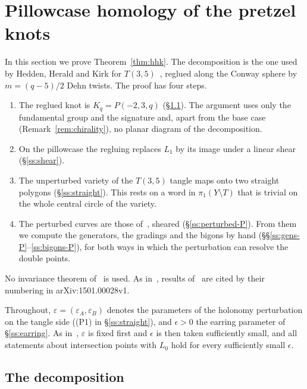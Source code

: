 \section{Pillowcase homology of the pretzel knots}\label{sec:sheared}

In this section we prove Theorem~\ref{thm:hhk}. The decomposition is the one used by Hedden, Herald and Kirk
for $T(3,5)$~\cite[\S10]{HHK2}, reglued along the Conway sphere by $m=(q-5)/2$ Dehn twists. The proof has
four steps.
\begin{enumerate}
\item The reglued knot is $K_q=P(-2,3,q)$ (\S\ref{ss:decomp-P}). The argument uses only the fundamental group and the
signature and, apart from the base case (Remark~\ref{rem:chirality}), no planar diagram of the decomposition.
\item On the pillowcase the regluing replaces $L_1$ by its image under a linear shear (\S\ref{ss:shear}).
\item The unperturbed variety of the $T(3,5)$ tangle maps onto two straight polygons (\S\ref{ss:straight}). This rests
on a word in $\pi_1(Y\setminus T)$ that is trivial on the whole central circle of the variety.
\item The perturbed curves are those of~\cite{WuebbenV}, sheared (\S\ref{ss:perturbed-P}). From them we compute the
generators, the gradings and the bigons by hand (\S\S\ref{ss:gens-P}--\ref{ss:bigons-P}), for both ways in which the
perturbation can resolve the double points.
\end{enumerate}
No invariance theorem of~\cite{HHK2} is used. As in~\cite{WuebbenV}, results of~\cite{HHK2} are cited by their
numbering in arXiv:1501.00028v1.

Throughout, $\varepsilon=(\varepsilon_A,\varepsilon_B)$ denotes the parameters of the holonomy perturbation on the tangle side
((P1) in \S\ref{ss:straight}), and $\epsilon>0$ the earring parameter of \S\ref{ss:earring}. As in~\cite[\S6]{WuebbenV}, $\varepsilon$ is fixed first and $\epsilon$ is
then taken sufficiently small, and all statements about intersection points with $L_0$ hold for every
sufficiently small $\epsilon$.

\subsection{The decomposition}\label{ss:decomp-P}

